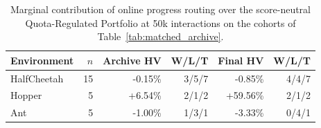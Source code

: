 \begin{table}[!htbp]
\centering\small\setlength{\tabcolsep}{4.5pt}
\caption{Marginal contribution of online progress routing over the score-neutral Quota-Regulated Portfolio at 50k interactions on the cohorts of Table~\ref{tab:matched_archive}.}
\label{tab:selector_effect}
\begin{tabular}{@{}lrrrrr@{}}
\toprule
Environment & $n$ & Archive HV & W/L/T & Final HV & W/L/T \\
\midrule
HalfCheetah & 15 & -0.15\% & 3/5/7 & -0.85\% & 4/4/7 \\
Hopper & 5 & +6.54\% & 2/1/2 & +59.56\% & 2/1/2 \\
Ant & 5 & -1.00\% & 1/3/1 & -3.33\% & 0/4/1 \\
\bottomrule
\end{tabular}
\end{table}
